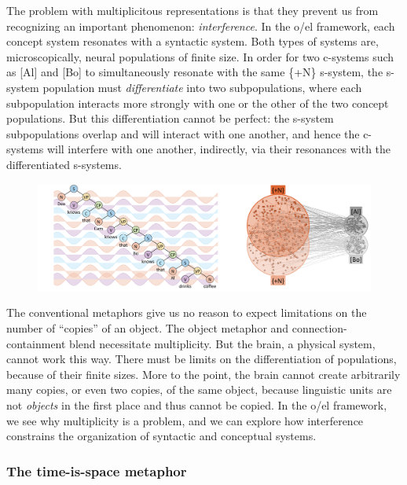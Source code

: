   The problem with multiplicitous representations is that they prevent us from recognizing an important phenomenon: \textit{interference}. In the o/el framework, each concept system resonates with a syntactic system. Both types of systems are, microscopically, neural populations of finite size. In order for two c-systems such as [Al] and [Bo] to simultaneously resonate with the same \{+N\} s-system, the s-system population must \textit{differentiate} into two subpopulations, where each subpopulation interacts more strongly with one or the other of the two concept populations. But this differentiation cannot be perfect: the s-system subpopulations overlap and will interact with one another, and hence the c-systems will interfere with one another, indirectly, via their resonances with the differentiated s-systems. 

  
\begin{figure}
\includegraphics[width=\textwidth]{figures/Tilsen-img37.png}
\caption{\missingcaption}
\label{fig:}
\end{figure}
 

  The conventional metaphors give us no reason to expect limitations on the number of “copies” of an object. The object metaphor and connection-containment blend necessitate multiplicity. But the brain, a physical system, cannot work this way. There must be limits on the differentiation of populations, because of their finite sizes. More to the point, the brain cannot create arbitrarily many copies, or even two copies, of the same object, because linguistic units are not \textit{objects} in the first place and thus cannot be copied. In the o/el framework, we see why multiplicity is a problem, and we can explore how interference constrains the organization of syntactic and conceptual systems.

\subsubsection{The time-is-space metaphor}

